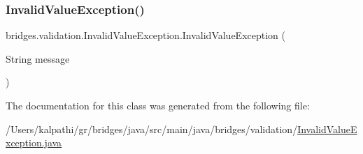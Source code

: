 \subsubsection{\texorpdfstring{InvalidValueException()}{InvalidValueException()}}
{\footnotesize\ttfamily bridges.\+validation.\+Invalid\+Value\+Exception.\+Invalid\+Value\+Exception (\begin{DoxyParamCaption}\item[{String}]{message }\end{DoxyParamCaption})}



The documentation for this class was generated from the following file\+:\begin{DoxyCompactItemize}
\item 
/\+Users/kalpathi/gr/bridges/java/src/main/java/bridges/validation/\mbox{\hyperlink{_invalid_value_exception_8java}{Invalid\+Value\+Exception.\+java}}\end{DoxyCompactItemize}
